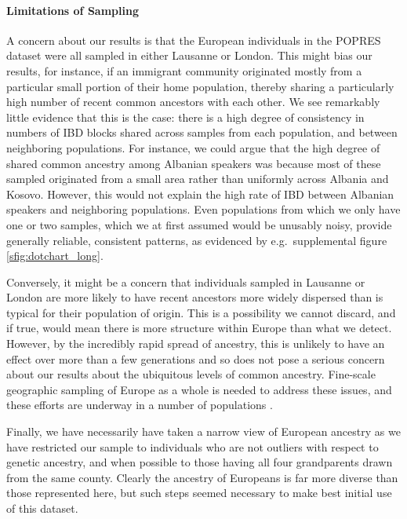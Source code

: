 \documentclass{article}
\begin{document}
\paragraph{Limitations of Sampling}
A concern about our results is that the European individuals in the POPRES dataset
were all sampled in either Lausanne or London.
This might bias our results,
for instance, if an immigrant community originated
mostly from a particular small portion of their home population, 
thereby sharing a particularly high number of recent common ancestors with each other.
We see remarkably little evidence that this is the case:
there is a high degree of consistency in numbers of IBD blocks shared across samples from each population,
and between neighboring populations.
For instance, we could argue that the high degree of shared common ancestry among Albanian speakers
was because most of these sampled originated from a small area rather than uniformly across Albania and Kosovo.
However, this would not explain the high rate of IBD between Albanian speakers and neighboring populations.
Even populations from which we only have one or two samples,
which we at first assumed would be unusably noisy,
provide generally reliable, consistent patterns,
as evidenced by e.g.\ supplemental figure \ref{sfig:dotchart_long}.


Conversely, it might be a concern that individuals sampled in Lausanne or London
are more likely to have recent ancestors more widely dispersed than is typical for their population of origin.
This is a possibility we cannot discard, and if true,
would mean there is more structure within Europe than what we detect.
However, by the incredibly rapid spread of ancestry,
this is unlikely to have an effect over more than a few generations
and so does not pose a serious concern about our results about
the ubiquitous levels of common ancestry.
Fine-scale geographic sampling of Europe as a whole is needed to address these issues,
and these efforts are underway in a number of populations \citep[e.g.][]{price2009impact,jakkula2008genomewide,tylersmith2012british,winney2011people}.


Finally, we have necessarily have taken a narrow view of European
ancestry as we have restricted our sample to individuals who are not
outliers with respect to genetic ancestry, and
when possible to those having all four grandparents drawn from the same county. 
Clearly the ancestry of Europeans is far more diverse  
than those represented here, 
but such steps seemed necessary to make best initial use of this dataset.
\end{document}
